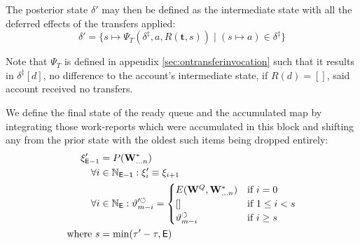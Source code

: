 The posterior state $\delta'$ may then be defined as the intermediate state with all the deferred effects of the transfers applied:
\begin{equation}
  \delta' = \{ s \mapsto \Psi_T(\delta^\ddagger, a, R(\mathbf{t}, s)) \mid (s \mapsto a) \in \delta^\ddagger \}
\end{equation}

Note that $\Psi_T$ is defined in appendix \ref{sec:ontransferinvocation} such that it results in $\delta^\ddagger[d]$, \ie no difference to the account's intermediate state, if $R(d) = []$, \ie said account received no transfers.

We define the final state of the ready queue and the accumulated map by integrating those work-reports which were accumulated in this block and shifting any from the prior state with the oldest such items being dropped entirely:
\begin{align}
  \xi'_{\mathsf{E} - 1} &= P(\mathbf{W}^*_{\dots n}) \\
  \forall i &\in \mathbb{N}_\mathsf{E - 1}: \xi'_{i} \equiv \xi_{i + 1} \\
  \forall i &\in \mathbb{N}_\mathsf{E} : \vartheta'^\circlearrowleft_{m - i} = \begin{cases}
    E(\mathbf{W}^Q, \mathbf{W}^*_{\dots n}) &\text{if } i = 0 \\
    [] &\text{if } 1 \le i < s \\
    \vartheta^\circlearrowleft_{m - i} &\text{if } i \ge s
  \end{cases} \\
  \text{where } s &= \min(\tau' - \tau, \mathsf{E})
\end{align}
